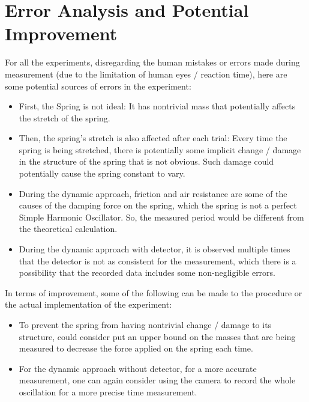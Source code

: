 \documentclass{article}
\begin{document}
\section{Error Analysis and Potential Improvement}
For all the experiments, disregarding the human mistakes or errors made during measurement (due to the limitation of human eyes / reaction time), here are some potential sources of errors in the experiment:
\begin{itemize}
    \item First, the Spring is not ideal: It has nontrivial mass that potentially affects the stretch of the spring.
    \item Then, the spring's stretch is also affected after each trial: Every time the spring is being stretched, there is potentially some implicit change / damage in the structure of the spring that is not obvious. Such damage could potentially cause the spring constant to vary.
    \item During the dynamic approach, friction and air resistance are some of the causes of the damping force on the spring, which the spring is not a perfect Simple Harmonic Oscillator. So, the measured period would be different from the theoretical calculation.
    \item During the dynamic approach with detector, it is observed multiple times that the detector is not as consistent for the measurement, which there is a possibility that the recorded data includes some non-negligible errors.
\end{itemize}
In terms of improvement, some of the following can be made to the procedure or the actual implementation of the experiment:
\begin{itemize}
    \item To prevent the spring from having nontrivial change / damage to its structure, could consider put an upper bound on the masses that are being measured to decrease the force applied on the spring each time.
    \item For the dynamic approach without detector, for a more accurate measurement, one can again consider using the camera to record the whole oscillation for a more precise time measurement.
\end{itemize}

\hfill

\hfill
\end{document}
